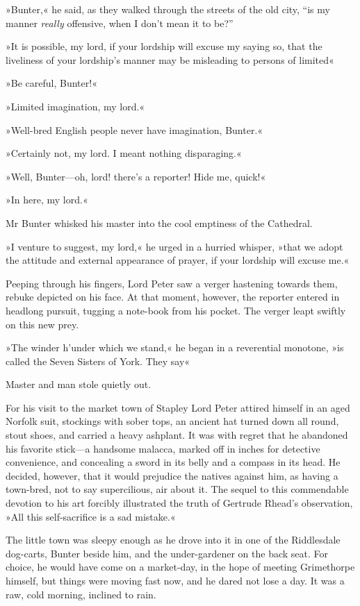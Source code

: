 »Bunter,« he said, as they walked through the streets of the old city, \enquote{is my manner \textit{really} offensive, when I don't mean it to be?}

»It is possible, my lord, if your lordship will excuse my saying so, that the liveliness of your lordship's manner may be misleading to persons of limited\longdash«

»Be careful, Bunter!«

»Limited imagination, my lord.«

»Well-bred English people never have imagination, Bunter.«

»Certainly not, my lord. I meant nothing disparaging.«

»Well, Bunter\allowbreak---\allowbreak oh, lord! there's a reporter! Hide me, quick!«

»In here, my lord.«

Mr Bunter whisked his master into the cool emptiness of the Cathedral.

»I venture to suggest, my lord,« he urged in a hurried whisper, »that we adopt the attitude and external appearance of prayer, if your lordship will excuse me.«

Peeping through his fingers, Lord Peter saw a verger hastening towards them, rebuke depicted on his face. At that moment, however, the reporter entered in headlong pursuit, tugging a note-book from his pocket. The verger leapt swiftly on this new prey.

»The winder h'under which we stand,« he began in a reverential monotone, »is called the Seven Sisters of York. They say\longdash«

Master and man stole quietly out.

For his visit to the market town of Stapley Lord Peter attired himself in an aged Norfolk suit, stockings with sober tops, an ancient hat turned down all round, stout shoes, and carried a heavy ashplant. It was with regret that he abandoned his favorite stick\allowbreak---\allowbreak a handsome malacca, marked off in inches for detective convenience, and concealing a sword in its belly and a compass in its head. He decided, however, that it would prejudice the natives against him, as having a town-bred, not to say supercilious, air about it. The sequel to this commendable devotion to his art forcibly illustrated the truth of Gertrude Rhead's observation, »All this self-sacrifice is a sad mistake.«

The little town was sleepy enough as he drove into it in one of the Riddlesdale dog-carts, Bunter beside him, and the under-gardener on the back seat. For choice, he would have come on a market-day, in the hope of meeting Grimethorpe himself, but things were moving fast now, and he dared not lose a day. It was a raw, cold morning, inclined to rain.

